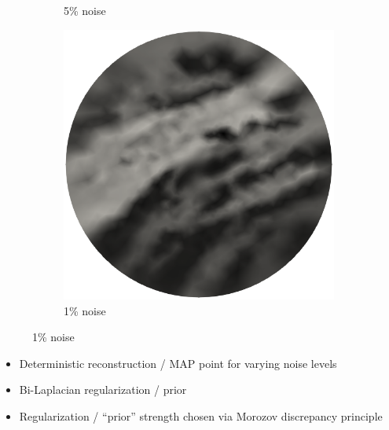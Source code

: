 \documentclass[10pt,final,xcolor=dvipsnames]{beamer}
\begin{document}
\begin{frame}
\begin{figure}
\begin{subfigure}{0.32\textwidth}
		\caption{5\% noise}
	\end{subfigure}
	\begin{subfigure}{0.32\textwidth}
		\includegraphics[scale=0.17]{mstar_0.01noise_cropped.png}
		\caption{1\% noise}
	\end{subfigure}
\end{figure}
\begin{itemize}
\item Deterministic reconstruction / MAP point for varying noise levels
\item Bi-Laplacian regularization / prior
\item Regularization / ``prior'' strength chosen via Morozov discrepancy principle
\end{itemize}
\end{frame}
\end{document}
